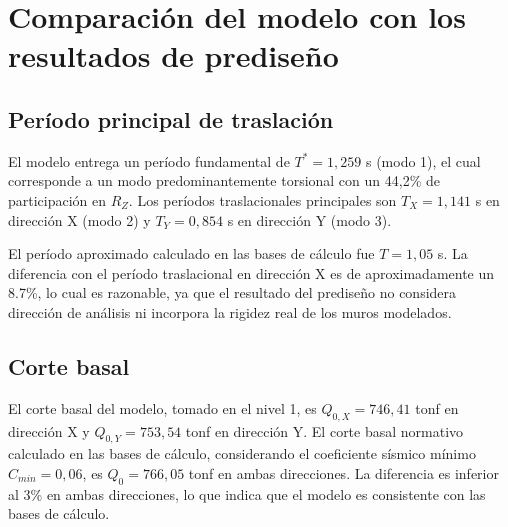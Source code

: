 \section{Comparación del modelo con los resultados de prediseño}

\subsection{Período principal de traslación}

El modelo entrega un período fundamental de $T^* = 1{,}259$ s (modo 1), el cual 
corresponde a un modo predominantemente torsional con un 44{,}2\% de participación 
en $R_Z$. Los períodos traslacionales principales son $T_X = 1{,}141$ s en dirección 
X (modo 2) y $T_Y = 0{,}854$ s en dirección Y (modo 3).

El período aproximado calculado en las bases de cálculo fue $T = 1{,}05$ s. La diferencia con el período traslacional 
en dirección X es de aproximadamente un 8.7\%, lo cual es razonable, ya que el resultado del prediseño 
no considera dirección de análisis ni incorpora la rigidez real de los muros 
modelados. 

\subsection{Corte basal}

El corte basal del modelo, tomado en 
el nivel 1, es $Q_{0,X} = 746{,}41$ tonf en dirección X y $Q_{0,Y} = 753{,}54$ tonf 
en dirección Y. El corte basal normativo calculado en las bases de cálculo, considerando 
el coeficiente sísmico mínimo $C_{min} = 0{,}06$, es $Q_0 = 766{,}05$ tonf en 
ambas direcciones. La diferencia es inferior al 3\% en ambas direcciones, lo que 
indica que el modelo es consistente con las bases de cálculo.
